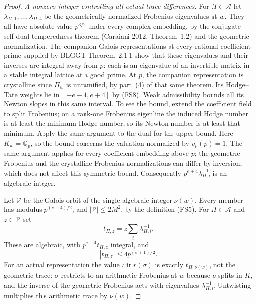\begin{proof}
\emph{A nonzero integer controlling all actual trace differences.}
For \(\Pi\in\mathcal A\) let
\(\lambda_{\Pi,1},\ldots,\lambda_{\Pi,4}\) be the
geometrically normalized Frobenius eigenvalues at \(w\).
They all have absolute value \(p^{3/2}\) under every
complex embedding, by the conjugate self-dual temperedness
theorem (Caraiani 2012, Theorem~1.2) and the geometric
normalization. The companion Galois representations
at every rational coefficient prime supplied by
BLGGT Theorem~2.1.1 show that these eigenvalues and
their inverses are integral away from \(p\):
each is an eigenvalue of an invertible matrix in a
stable integral lattice at a good prime.
At \(p\), the companion representation is crystalline
since \(\Pi_w\) is unramified, by part~(4) of that
same theorem. Its Hodge--Tate weights lie in
\([-e-4,e+4]\) by (FS8). Weak admissibility bounds all
its Newton slopes in this same interval. To see the
bound, extend the coefficient field to split Frobenius;
on a rank-one Frobenius eigenline the induced Hodge
number is at least the minimum Hodge number, so its
Newton number is at least that minimum. Apply the same
argument to the dual for the upper bound.
Here \(K_w=\mathbb Q_p\), so the bound concerns the
valuation normalized by \(v_p(p)=1\).
The same argument applies for every coefficient embedding
above \(p\); the geometric Frobenius and the crystalline
Frobenius normalizations can differ by inversion, which
does not affect this symmetric bound.
Consequently \(p^{e+4}\lambda_{\Pi,i}^{-1}\) is an
algebraic integer.

Let \(\mathcal V\) be the Galois orbit of the single
algebraic integer \(\nu(w)\).
Every member has modulus \(p^{(e+4)/2}\), and
\(|\mathcal V|\le2M^2\), by the definition (FS5).
For \(\Pi\in\mathcal A\) and \(z\in\mathcal V\) set
\[
                     t_{\Pi,z}=z\sum_i\lambda_{\Pi,i}^{-1}.
\]
These are algebraic, with \(p^{e+4}t_{\Pi,z}\) integral,
and
\[
                       |t_{\Pi,z}|\le4p^{(e+1)/2}.
                                                               \tag{FS10}
\]
For an actual representation the value
\(\iota\operatorname{tr}r(\sigma)\) is exactly
\(t_{\Pi,\nu(w)}\), not the geometric trace:
\(\sigma\) restricts to an arithmetic Frobenius at \(w\)
because \(p\) splits in \(K\), and the inverse of the
geometric Frobenius acts with eigenvalues
\(\lambda_{\Pi,i}^{-1}\). Untwisting multiplies this
arithmetic trace by \(\nu(w)\).


\end{proof}
